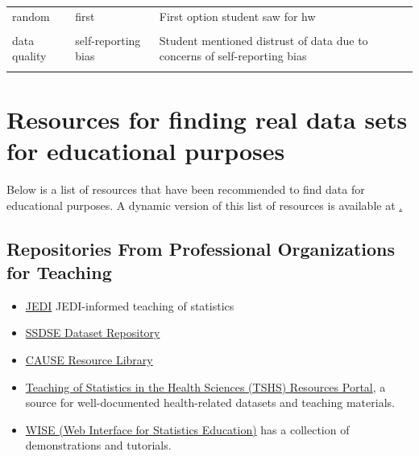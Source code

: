 \documentclass[
  letterpaper,
  DIV=11,
  numbers=noendperiod]{scrartcl}
\providecommand{\tightlist}{%
  \setlength{\itemsep}{0pt}\setlength{\parskip}{0pt}}\usepackage{longtable,booktabs,array}
\begin{document}
\begin{longtable}[t]{>{\raggedright\arraybackslash}p{1in}>{\raggedright\arraybackslash}p{1in}>{\raggedright\arraybackslash}p{4in}}
random & first & First option student saw for hw\\
\cellcolor{gray!10}{data quality} & \cellcolor{gray!10}{data quality} & \cellcolor{gray!10}{Distrust of quality of data due to topic}\\
\addlinespace
data quality & self-reporting bias & Student mentioned distrust of data due to concerns of self-reporting bias\\
\cellcolor{gray!10}{data quality} & \cellcolor{gray!10}{sample size} & \cellcolor{gray!10}{Student mentioned distrust of results due to concerns of sample size}\\
\bottomrule

\end{longtable}

\section{Resources for finding real data sets for educational
purposes}\label{sec-resources}

Below is a list of resources that have been recommended to find data for
educational purposes. A dynamic version of this list of resources is
available at \href{https://catalinamedina.github.io/resources.html}.

\subsection{Repositories From Professional Organizations for
Teaching}\label{repositories-from-professional-organizations-for-teaching}

\begin{itemize}
\tightlist
\item
  \href{https://causeweb.org/jedi/}{JEDI} JEDI-informed teaching of
  statistics
\item
  \href{https://docs.google.com/spreadsheets/d/1tuCXok_y_zQpSDGssaypETf9lnB6nCh9XVoCiMaPCuc/edit?gid=591469695\#gid=591469695}{SSDSE
  Dataset Repository}
\item
  \href{https://www.causeweb.org/cause/resources/library?field_material_type_tid=104}{CAUSE
  Resource Library}
\item
  \href{https://www.causeweb.org/tshs/}{Teaching of Statistics in the
  Health Sciences (TSHS) Resources Portal}, a source for well-documented
  health-related datasets and teaching materials.
\item
  \href{http://wise.cgu.edu/helpful-links/data-sources/}{WISE (Web
  Interface for Statistics Education)} has a collection of
  demonstrations and tutorials.
\end{itemize}
\end{document}
